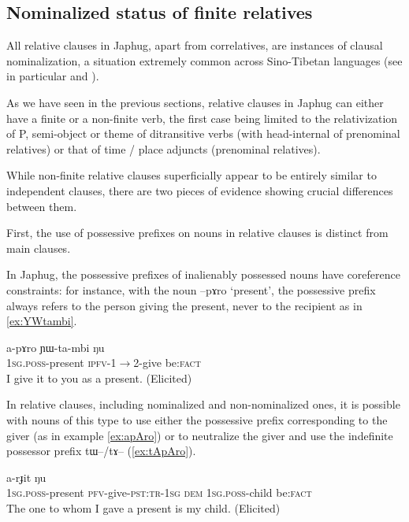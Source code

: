 \documentclass[oldfontcommands,oneside,a4paper,11pt]{article}
\newcommand{\ipa}[1]{{\phon #1}} %
\newcommand{\topic}{\textsc{dem}}
\begin{document}
\subsection{Nominalized status of finite relatives}
All relative clauses in Japhug, apart from correlatives, are instances of clausal nominalization, a situation extremely common across Sino-Tibetan languages (see in particular \citealt{genetti08nmlz} and \citealt{bickel99nmlz}).

As we have seen in the previous sections, relative clauses in Japhug can either have a finite or a non-finite verb, the first case being limited to the relativization of P, semi-object or theme of ditransitive verbs (with head-internal of prenominal relatives) or that of time / place adjuncts (prenominal relatives). 

While non-finite relative clauses superficially appear to be entirely similar to independent clauses, there are two pieces of evidence showing crucial differences between them.

First, the use of possessive prefixes on nouns in relative clauses is distinct from main clauses.

In Japhug, the possessive prefixes of inalienably possessed nouns have coreference constraints: for instance, with the noun \ipa{--pɤro} `present', the possessive prefix always refers to the person giving the present, never to the recipient as in \ref{ex:YWtambi}. 
	
			\begin{exe}
\ex \label{ex:YWtambi}
\gll
	\ipa{a-pɤro}  	\ipa{ɲɯ-ta-mbi}  	\ipa{ŋu}  \\
	\textsc{1sg.poss}-present \textsc{ipfv}-1$\rightarrow$2-give be:\textsc{fact} \\
	\glt I give it to you as a present. (Elicited)
 	  \end{exe} 
	 
In relative clauses, including nominalized and non-nominalized ones, it is possible with nouns of this type to use either the possessive prefix corresponding to the giver (as in example \ref{ex:apAro}) or to neutralize the giver and use the indefinite possessor prefix \ipa{tɯ}--/\ipa{tɤ}-- (\ref{ex:tApAro}).
	 

 		\begin{exe}
\ex \label{ex:apAro}
\gll
[\ipa{a-pɤro}  	\ipa{nɯ-mbi-t-a}]  	\ipa{nɯ}  	\ipa{a-rɟit}  	\ipa{ŋu}  \\
	\textsc{1sg.poss}-present \textsc{pfv}-give-\textsc{pst:tr-1sg} 	  \topic{} \textsc{1sg.poss}-child be:\textsc{fact} \\
\glt The one to whom I gave a present is my child. (Elicited)
 	  \end{exe} 
\end{document}
